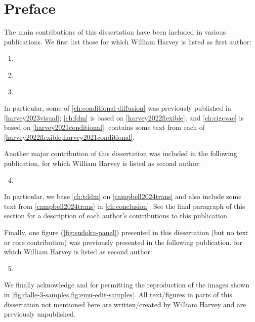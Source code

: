 
\chapter{Preface}

The main contributions of this dissertation have been included in various publications. We first list those for which William Harvey is listed as first author:
\begin{enumerate}
    \item {} \label{harvey2023visual}
    \item {} \label{harvey2022flexible}
    \item {} \label{harvey2021conditional}
\end{enumerate}
In particular, some of \cref{ch:conditional-diffusion} was previously published in \cref{harvey2023visual}; \cref{ch:fdm} is based on \cref{harvey2022flexible}; and \cref{ch:cigcvae} is based on \cref{harvey2021conditional}.  contains some text from each of \cref{harvey2022flexible,harvey2021conditional}.

Another major contribution of this dissertation was included in the following publication, for which William Harvey is listed as second author:
\begin{enumerate}
    \setcounter{enumi}{3}
    \item {} \label{campbell2024trans}
\end{enumerate}
In particular, we base \cref{ch:tddm} on \cref{campbell2024trans} and also include some text from \cref{campbell2024trans} in \cref{ch:conclusion}. See the final paragraph of this section for a description of each author's contributions to this publication.

Finally, one figure (\cref{fig:sudoku-panel}) presented in this dissertation (but no text or core contribution) was previously presented in the following publication, for which William Harvey is listed as second author:
\begin{enumerate}
    \setcounter{enumi}{4}
    \item {} \label{weilbach2023graphically}
\end{enumerate}
We finally acknowledge \citeauthor{sheynin2023emu} and \citeauthor{betker2023improving} for permitting the reproduction of the images shown in \cref{fig:dalle-3-samples,fig:emu-edit-samples}. All text/figures in parts of this dissertation not mentioned here are written/created by William Harvey and are previously unpublished.

